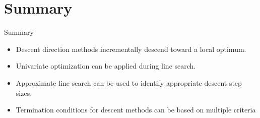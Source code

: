 \documentclass{beamer}
\begin{document}
\section{Summary}
\begin{frame}{Summary}
    \begin{itemize}
        \item Descent direction methods incrementally descend toward a local optimum.
        \item Univariate optimization can be applied during line search.
        \item Approximate line search can be used to identify appropriate descent step sizes.
        \item Termination conditions for descent methods can be based on multiple criteria
    \end{itemize}
\end{frame}
\end{document}
